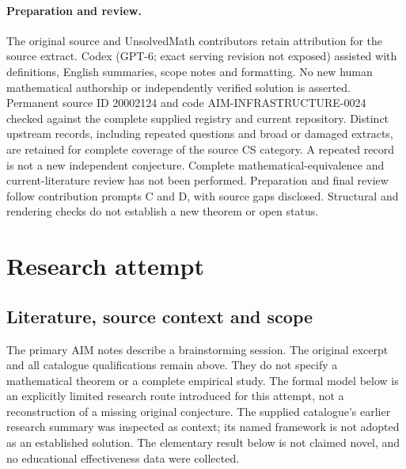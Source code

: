 \documentclass[11pt]{article}
\begin{document}
\paragraph{Preparation and review.}
The original source and UnsolvedMath contributors retain attribution for the source extract. Codex (GPT-6; exact serving revision not exposed) assisted with definitions, English summaries, scope notes and formatting. No new human mathematical authorship or independently verified solution is asserted. Permanent source ID 20002124 and code AIM-INFRASTRUCTURE-0024 checked against the complete supplied registry and current repository. Distinct upstream records, including repeated questions and broad or damaged extracts, are retained for complete coverage of the source CS category. A repeated record is not a new independent conjecture. Complete mathematical-equivalence and current-literature review has not been performed. Preparation and final review follow contribution prompts C and D, with source gaps disclosed. Structural and rendering checks do not establish a new theorem or open status.
\label{end:20002124}

\section{Research attempt}
\subsection{Literature, source context and scope}
The primary AIM notes describe a brainstorming session. The original excerpt and all catalogue qualifications remain above. They do not specify a mathematical theorem or a complete empirical study. The formal model below is an explicitly limited research route introduced for this attempt, not a reconstruction of a missing original conjecture. The supplied catalogue's earlier research summary was inspected as context; its named framework is not adopted as an established solution. The elementary result below is not claimed novel, and no educational effectiveness data were collected.
\end{document}
